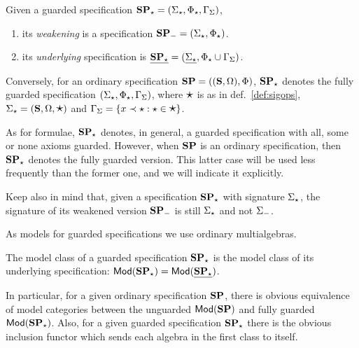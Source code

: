 \begin{definition}\label{def:specOps}
Given a guarded specification ${\bf SP_\star}
= (\Sigma_\star,\Phi_\star,\Gamma_{\Sigma})$, 
\begin{enumerate}\MyLPar
\item its {\em weakening} is a
specification ${\bf SP_-} = (\Sigma_\star,\Phi_\star)$.
\item its {\em underlying} specification is $\underline{{\bf SP_\star}} = (\underline{\Sigma_\star},
\Phi_\star \cup \Gamma_\Sigma)$.
\end{enumerate}
Conversely, for an ordinary specification ${\bf SP}=(({\bf S},\Omega),\Phi)$,
${\bf SP_\star}$ denotes the fully guarded specification
$(\Sigma_\star,\Phi_\star,\Gamma_{\Sigma})$, where $\mbox{\Large{$\star$}}$ is as in
def.~\ref{def:sigops}, 
$\Sigma_\star=({\bf S},\Omega,\mbox{\Large{$\star$}})$ and
$\Gamma_\Sigma=\{x\prec \star:\star\in\mbox{\Large{$\star$}}\}$.
\end{definition}
% 
As for formulae, ${\bf SP}_\star$ denotes, in general, a guarded specification with all,
some or none axioms guarded. However, when ${\bf SP}$ is an ordinary specification,
then ${\bf SP_\star}$ denotes the fully guarded version. This latter case will be
used less frequently than the former one, and we will indicate it explicitly.

Keep also in mind that, given a specification ${\bf SP_\star}$ with signature
$\Sigma_\star$, the signature of its weakened version ${\bf SP_-}$ is
still $\Sigma_\star$ and not $\Sigma_-$.

As models for guarded specifications we use ordinary multialgebras.
\begin{definition}
The model class of a guarded specification ${\bf SP_\star}$ is the
model class of its underlying specification: ${\sf {Mod}}({\bf SP_\star}) = {\sf {Mod}}(\underline{{\bf SP_\star}})$.
\end{definition}
In particular, for a given ordinary specification ${\bf SP}$, there is obvious equivalence of
model categories between the unguarded ${\sf {Mod}}({\bf SP})$ and fully guarded ${\sf {Mod}}({\bf SP_\star})$.
Also, for a given guarded specification ${\bf SP_\star}$ there is the obvious
inclusion functor
which sends each algebra in the first class to itself.


